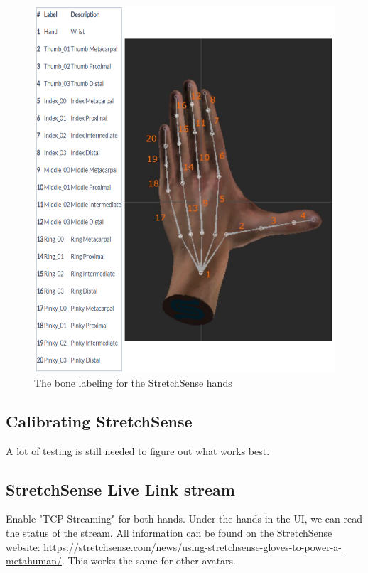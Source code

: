 \documentclass{uva-inf-article}
\begin{document}
\begin{figure}
    \centering
    \includegraphics[height=0.6\textheight]{imgs/StretchSenseMapping.png}
    \caption{The bone labeling for the StretchSense hands}
    \label{fig:sslabels}
\end{figure}

\subsection{Calibrating StretchSense}
A lot of testing is still needed to figure out what works best.


\subsection{StretchSense Live Link stream}
Enable "TCP Streaming" for both hands. Under the hands in the UI, we can read the status of the stream.
All information can be found on the StretchSense website: \url{https://stretchsense.com/news/using-stretchsense-gloves-to-power-a-metahuman/}.
This works the same for other avatars.
\end{document}
